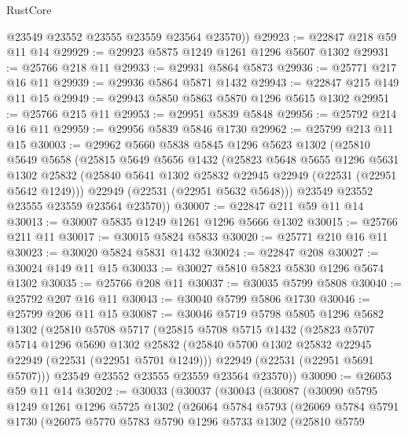 \begin{lexlean}{RustCore}
\begin{coremodule}
        @23549
        @23552
        @23555
        @23559
        @23564
        @23570))
@29923 := @22847 @218 @59 @11 @14
@29929 := @29923 @5875 @1249 @1261 @1296 @5607 @1302
@29931 := @25766 @218 @11
@29933 := @29931 @5864 @5873
@29936 := @25771 @217 @16 @11
@29939 := @29936 @5864 @5871 @1432
@29943 := @22847 @215 @149 @11 @15
@29949 := @29943 @5850 @5863 @5870 @1296 @5615 @1302
@29951 := @25766 @215 @11
@29953 := @29951 @5839 @5848
@29956 := @25792 @214 @16 @11
@29959 := @29956 @5839 @5846 @1730
@29962 := @25799 @213 @11 @15
@30003 := @29962
    @5660
    @5838
    @5845
    @1296
    @5623
    @1302
    (@25810
      @5649
      @5658
      (@25815
        @5649
        @5656
        @1432
        (@25823
          @5648
          @5655
          @1296
          @5631
          @1302
          @25832
          (@25840 @5641 @1302 @25832 @22945 @22949 (@22531 (@22951 @5642 @1249)))
          @22949
          (@22531 (@22951 @5632 @5648)))
        @23549
        @23552
        @23555
        @23559
        @23564
        @23570))
@30007 := @22847 @211 @59 @11 @14
@30013 := @30007 @5835 @1249 @1261 @1296 @5666 @1302
@30015 := @25766 @211 @11
@30017 := @30015 @5824 @5833
@30020 := @25771 @210 @16 @11
@30023 := @30020 @5824 @5831 @1432
@30024 := @22847 @208
@30027 := @30024 @149 @11 @15
@30033 := @30027 @5810 @5823 @5830 @1296 @5674 @1302
@30035 := @25766 @208 @11
@30037 := @30035 @5799 @5808
@30040 := @25792 @207 @16 @11
@30043 := @30040 @5799 @5806 @1730
@30046 := @25799 @206 @11 @15
@30087 := @30046
    @5719
    @5798
    @5805
    @1296
    @5682
    @1302
    (@25810
      @5708
      @5717
      (@25815
        @5708
        @5715
        @1432
        (@25823
          @5707
          @5714
          @1296
          @5690
          @1302
          @25832
          (@25840 @5700 @1302 @25832 @22945 @22949 (@22531 (@22951 @5701 @1249)))
          @22949
          (@22531 (@22951 @5691 @5707)))
        @23549
        @23552
        @23555
        @23559
        @23564
        @23570))
@30090 := @26053 @59 @11 @14
@30202 := @30033
    (@30037
      (@30043
        (@30087
          (@30090
            @5795
            @1249
            @1261
            @1296
            @5725
            @1302
            (@26064
              @5784
              @5793
              (@26069
                @5784
                @5791
                @1730
                (@26075
                  @5770
                  @5783
                  @5790
                  @1296
                  @5733
                  @1302
                  (@25810
                    @5759

\end{coremodule}
\end{lexlean}
